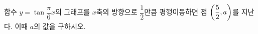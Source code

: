 함수 $y=\tan\dfrac{\pi}{6}x$의 그래프를 $x$축의 방향으로 $\dfrac{1}{2}$만큼 평행이동하면 점 $\left(\dfrac{5}{2}{,}\mkern3mu\mathopen{}a\right)$를 지난다. 이때 $a$의 값을 구하시오.
